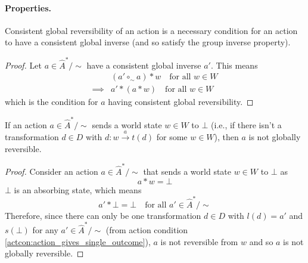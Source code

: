 \paragraph{Properties. }

\begin{proposition}
    Consistent global reversibility of an action is a necessary condition for an action to have a consistent global inverse (and so satisfy the group inverse property).
\end{proposition}
\begin{proof}
    Let $a \in \hat{A}^{*}/\sim$ have a consistent global inverse $a'$.
    This means
    \begin{align}
        & (a' \circ_{\sim} a) \ast w \quad \text{for all $w \in W$} \\
        \implies & a' \ast ( a \ast w) \quad \text{for all $w \in W$}
    \end{align}
    which is the condition for $a$ having consistent global reversibility.
\end{proof}

\begin{proposition}
    If an action $a \in \hat{A}^{*}/\sim$ sends a world state $w \in W$ to $\bot$ (i.e., if there isn't a transformation $d \in D$ with $d: w \xrightarrow{a} t(d)$ for some $w \in W$), then $a$ is not globally reversible.
\end{proposition}
\begin{proof}
    Consider an action $a \in \hat{A}^{*}/\sim$ that sends a world state $w \in W$ to $\bot$ as
    \begin{equation}
        a * w = \bot
    \end{equation}
    $\bot$ is an absorbing state, which means
    \begin{equation}
        a' * \bot = \bot \quad \text{for all $a' \in \hat{A}^{*}/\sim$}
    \end{equation}
    Therefore, since there can only be one transformation $d \in D$ with $l(d) = a'$ and $s(\bot)$ for any $a' \in \hat{A}^{*}/\sim$ (from action condition \ref{actcon:action_gives_single_outcome}), $a$ is not reversible from $w$ and so $a$ is not globally reversible.
\end{proof}

